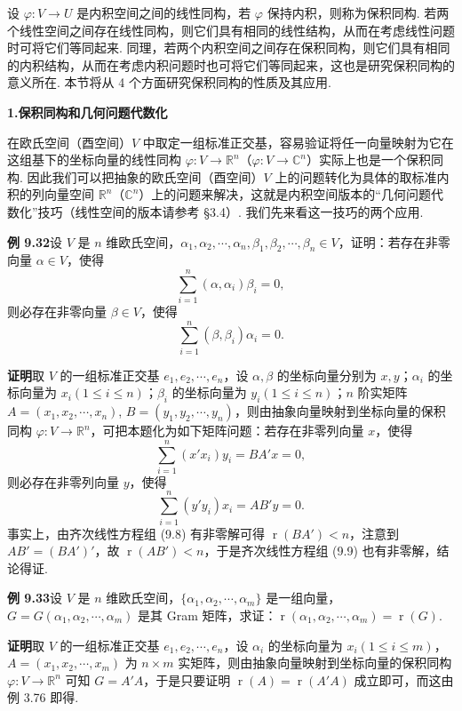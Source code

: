 \documentclass[UTF8,12pt,a4paper,fontset=fandol]{ctexart}
\begin{document}
设 $\varphi:V\to U$ 是内积空间之间的线性同构，若 $\varphi$ 保持内积，则称为保积同构. 若两个线性空间之间存在线性同构，则它们具有相同的线性结构，从而在考虑线性问题时可将它们等同起来. 同理，若两个内积空间之间存在保积同构，则它们具有相同的内积结构，从而在考虑内积问题时也可将它们等同起来，这也是研究保积同构的意义所在. 本节将从 4 个方面研究保积同构的性质及其应用.

\noindent\textbf{1.\quad 保积同构和几何问题代数化}

在欧氏空间（酉空间）$V$ 中取定一组标准正交基，容易验证将任一向量映射为它在这组基下的坐标向量的线性同构 $\varphi:V\to\mathbb{R}^n$（$\varphi:V\to\mathbb{C}^n$）实际上也是一个保积同构. 因此我们可以把抽象的欧氏空间（酉空间）$V$ 上的问题转化为具体的取标准内积的列向量空间 $\mathbb{R}^n$（$\mathbb{C}^n$）上的问题来解决，这就是内积空间版本的“几何问题代数化”技巧（线性空间的版本请参考 §3.4）. 我们先来看这一技巧的两个应用.

\noindent\textbf{例 9.32}\quad 设 $V$ 是 $n$ 维欧氏空间，$\alpha_1,\alpha_2,\cdots,\alpha_n,\beta_1,\beta_2,\cdots,\beta_n\in V$，证明：若存在非零向量 $\alpha\in V$，使得
\[
\sum_{i=1}^n(\alpha,\alpha_i)\beta_i=0,
\]
则必存在非零向量 $\beta\in V$，使得
\[
\sum_{i=1}^n(\beta,\beta_i)\alpha_i=0.
\]

\noindent\textbf{证明}\quad 取 $V$ 的一组标准正交基 $e_1,e_2,\cdots,e_n$，设 $\alpha,\beta$ 的坐标向量分别为 $x,y$；$\alpha_i$ 的坐标向量为 $x_i(1\le i\le n)$；$\beta_i$ 的坐标向量为 $y_i(1\le i\le n)$；$n$ 阶实矩阵 $A=(x_1,x_2,\cdots,x_n)$, $B=(y_1,y_2,\cdots,y_n)$，则由抽象向量映射到坐标向量的保积同构 $\varphi:V\to\mathbb{R}^n$，可把本题化为如下矩阵问题：若存在非零列向量 $x$，使得
\begin{equation}
\sum_{i=1}^n(x'x_i)y_i=BA'x=0,
\tag{9.8}
\end{equation}
则必存在非零列向量 $y$，使得
\begin{equation}
\sum_{i=1}^n(y'y_i)x_i=AB'y=0.
\tag{9.9}
\end{equation}
事实上，由齐次线性方程组 (9.8) 有非零解可得 $\operatorname{r}(BA')<n$，注意到 $AB'=(BA')'$，故 $\operatorname{r}(AB')<n$，于是齐次线性方程组 (9.9) 也有非零解，结论得证.

\noindent\textbf{例 9.33}\quad 设 $V$ 是 $n$ 维欧氏空间，$\{\alpha_1,\alpha_2,\cdots,\alpha_m\}$ 是一组向量，$G=G(\alpha_1,\alpha_2,\cdots,\alpha_m)$ 是其 Gram 矩阵，求证：$\operatorname{r}(\alpha_1,\alpha_2,\cdots,\alpha_m)=\operatorname{r}(G)$.

\noindent\textbf{证明}\quad 取 $V$ 的一组标准正交基 $e_1,e_2,\cdots,e_n$，设 $\alpha_i$ 的坐标向量为 $x_i(1\le i\le m)$，$A=(x_1,x_2,\cdots,x_m)$ 为 $n\times m$ 实矩阵，则由抽象向量映射到坐标向量的保积同构 $\varphi:V\to\mathbb{R}^n$ 可知 $G=A'A$，于是只要证明 $\operatorname{r}(A)=\operatorname{r}(A'A)$ 成立即可，而这由例 3.76 即得.
\end{document}
